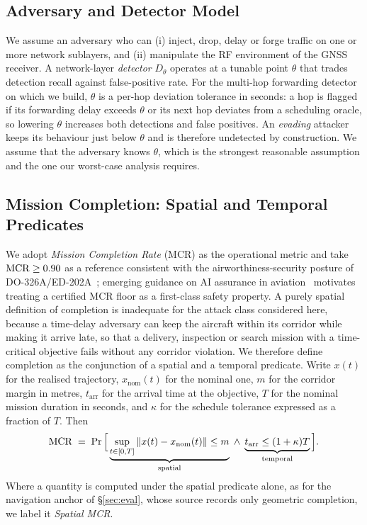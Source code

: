 \subsection{Adversary and Detector Model}
\label{sec:adversary}
We assume an adversary who can (i) inject, drop, delay or forge traffic on one
or more network sublayers, and (ii) manipulate the RF environment of the GNSS
receiver. A network-layer \emph{detector} $D_\theta$ operates at a tunable
point $\theta$ that trades detection recall against false-positive rate. For
the multi-hop forwarding detector on which we build, $\theta$ is a per-hop
deviation tolerance in seconds: a hop is flagged if its forwarding delay
exceeds $\theta$ or its next hop deviates from a scheduling oracle, so lowering
$\theta$ increases both detections and false positives. An \emph{evading}
attacker keeps its behaviour just below $\theta$ and is therefore undetected by
construction. We assume that the adversary knows $\theta$, which is the
strongest reasonable assumption and the one our worst-case analysis requires.

\subsection{Mission Completion: Spatial and Temporal Predicates}
\label{sec:mcr}
We adopt \emph{Mission Completion Rate} (MCR) as the operational metric and
take $\mathrm{MCR}\ge0.90$ as a reference consistent with the airworthiness-security
posture of DO-326A/ED-202A~\cite{do326a}; emerging guidance on AI assurance in
aviation~\cite{ed324} motivates treating a certified MCR floor as a first-class
safety property. A purely spatial definition of completion is inadequate for
the attack class considered here, because a time-delay adversary can keep the
aircraft within its corridor while making it arrive late, so that a delivery,
inspection or search mission with a time-critical objective fails without any
corridor violation. We therefore define completion as the conjunction of a
spatial and a temporal predicate. Write $x(t)$ for the realised trajectory,
$x_{\mathrm{nom}}(t)$ for the nominal one, $m$ for the corridor margin in
metres, $t_{\mathrm{arr}}$ for the arrival time at the objective, $T$ for the
nominal mission duration in seconds, and $\kappa$ for the schedule tolerance
expressed as a fraction of $T$. Then
\begin{equation}
\label{eq:mcr}
\mathrm{MCR} \;=\; \Pr\Big[\underbrace{\sup_{t\in[0,T]}\left\lVert x(t)-x_{\mathrm{nom}}(t)\right\rVert\le m}_{\text{spatial}}
\;\wedge\;
\underbrace{t_{\mathrm{arr}}\le(1+\kappa)T}_{\text{temporal}}\Big].
\end{equation}
Where a quantity is computed under the spatial predicate alone, as for the
navigation anchor of \S\ref{sec:eval}, whose source records only geometric
completion, we label it \emph{Spatial MCR}.

